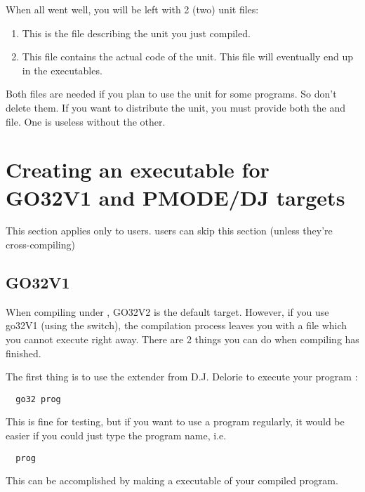 \documentclass{report}
\begin{document}
When all went well, you will be left with 2 (two) unit files:
\begin{enumerate}
\item {} This is the file describing the unit you just
compiled.
\item {} This file contains the actual code of the unit.
This file will eventually end up in the executables.
\end{enumerate}
Both files are needed if you plan to use the unit for some programs. 
So don't delete them. If you want to distribute the unit, you must
provide both the  and  file. One is useless without the
other.

\section{Creating an executable for GO32V1 and PMODE/DJ targets}

This section applies only to \dos users. \linux users can skip this
section (unless they're cross-compiling)

%
%
\subsection{GO32V1}
When compiling under \dos, GO32V2 is the default target. However, if you use
go32V1 (using the  switch), the 
compilation process leaves you with a file which you cannot execute right away.
There are 2 things you can do when compiling has finished.

The first thing is to use the \dos extender from D.J. Delorie to execute
your program :
\begin{verbatim}
  go32 prog
\end{verbatim}
This is fine for testing, but if you want to use a program regularly, it
would be easier if you could just type the program name, i.e.
\begin{verbatim}
  prog
\end{verbatim}
This can be accomplished by making a \dos executable of your compiled program.
 
\end{document}
